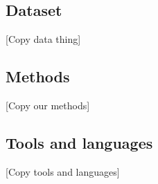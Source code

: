 \subsection{Dataset}
[Copy data thing]

\subsection{Methods}
[Copy our methods]

\subsection{Tools and languages}
[Copy tools and languages]